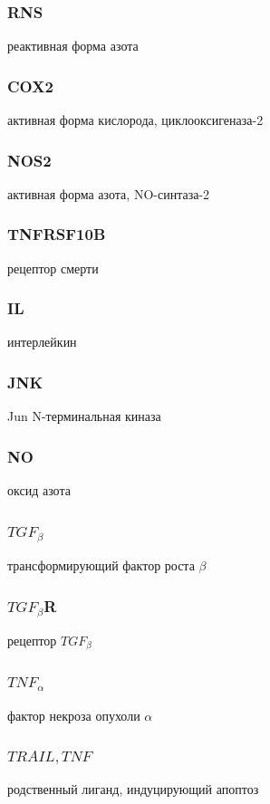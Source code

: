 \documentclass[11pt]{article}
\begin{document}
	\subsubsection{RNS}	
		реактивная форма азота

	\subsubsection{COX2}	
		активная форма кислорода, циклооксигеназа-2	

	\subsubsection{NOS2}	
		активная форма азота, NO-синтаза-2	

	\subsubsection{TNFRSF10B}	
		рецептор смерти	

	\subsubsection{IL}	
		интерлейкин

	\subsubsection{JNK}	
		Jun N-терминальная киназа

	\subsubsection{NO}	
		оксид азота

	\subsubsection{$TGF_{\beta}$}	
		трансформирующий фактор роста $\beta$

	\subsubsection{$TGF_{\beta}$R}	
		рецептор $TGF_{\beta}$

	\subsubsection{$TNF_{\alpha}$}	
		фактор некроза опухоли $\alpha$

	\subsubsection{$TRAIL, TNF$}	
		родственный лиганд, индуцирующий апоптоз
		
\end{document}
